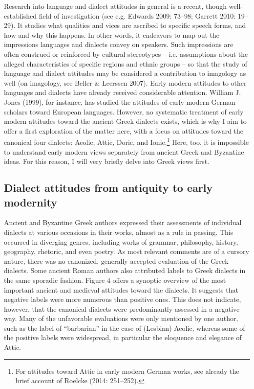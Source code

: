 \begin{styleStandard}
Research into language and dialect attitudes in general is a recent, though well-established field of investigation (see e.g. Edwards 2009: 73–98; Garrett 2010: 19–29). It studies what qualities and vices are ascribed to specific speech forms, and how and why this happens. In other words, it endeavors to map out the impressions languages and dialects convey on speakers. Such impressions are often construed or reinforced by cultural stereotypes – i.e. assumptions about the alleged characteristics of specific regions and ethnic groups – so that the study of language and dialect attitudes may be considered a contribution to imagology as well (on imagology, see Beller \& Leerssen 2007). Early modern attitudes to other languages and dialects have already received considerable attention. William J. Jones (1999), for instance, has studied the attitudes of early modern German scholars toward European languages. However, no systematic treatment of early modern attitudes toward the ancient Greek dialects exists, which is why I aim to offer a first exploration of the matter here, with a focus on attitudes toward the canonical four dialects: Aeolic, Attic, Doric, and Ionic.\footnote{ For attitudes toward Attic in early modern German works, see already the brief account of Roelcke (2014: 251–252).} Here, too, it is impossible to understand early modern views separately from ancient Greek and Byzantine ideas. For this reason, I will very briefly delve into Greek views first.
\end{styleStandard}

\subsection{Dialect attitudes from antiquity to early modernity}
\hypertarget{Toc19704851}{}\begin{styleStandard}
Ancient and Byzantine Greek authors expressed their assessments of individual dialects at various occasions in their works, almost as a rule in passing. This occurred in diverging genres, including works of grammar, philosophy, history, geography, rhetoric, and even poetry. As most relevant comments are of a cursory nature, there was no canonized, generally accepted evaluation of the Greek dialects. Some ancient Roman authors also attributed labels to Greek dialects in the same sporadic fashion. Figure 4 offers a synoptic overview of the most important ancient and medieval attitudes toward the dialects. It suggests that negative labels were more numerous than positive ones. This does not indicate, however, that the canonical dialects were predominantly assessed in a negative way. Many of the unfavorable evaluations were only mentioned by one author, such as the label of “barbarian” in the case of (Lesbian) Aeolic, whereas some of the positive labels were widespread, in particular the eloquence and elegance of Attic.
\end{styleStandard}

